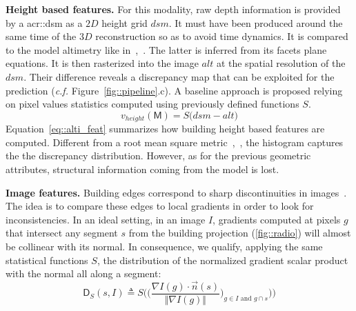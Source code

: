 \documentclass[runningheads]{llncs}
\begin{document}
\noindent
\textbf{Height based features.}
For this modality, raw depth information is provided by a \acrlong{acr::dsm} as a $2D$ height grid $dsm$. It must have been produced around the same time of the $3D$ reconstruction so as to avoid time dynamics. It is compared to the model altimetry like in~\cite{Bredif2007},~\cite{zebedin2008fusion}. The latter is inferred from its facets plane equations. It is then rasterized into the image $alt$ at the spatial resolution of the $dsm$. Their difference reveals a discrepancy map that can be exploited for the prediction (\textit{c.f.} Figure~\ref{fig::pipeline}.c). A baseline approach is proposed relying on pixel values statistics computed using previously defined functions $S$.
\begin{equation}
	\label{eq::alti_feat}
    v_{height}(\mathsf{M}) = S\big( dsm - alt \big)
\end{equation}
Equation~\ref{eq::alti_feat} summarizes how building height based features are computed. Different from a root mean square metric~\cite{lafarge2012creating},~\cite{Poullis2013}, the histogram captures the the discrepancy distribution. However, as for the previous geometric attributes, structural information coming from the model is lost.

\noindent
\textbf{Image features.}
Building edges correspond to sharp discontinuities in images~\cite{ortner2007building}. The idea is to compare these edges to local gradients in order to look for inconsistencies. In an ideal setting, in an image $I$, gradients computed at pixels $g$ that intersect any segment $s$ from the building projection (\ref{fig::radio}) will almost be collinear with its normal. In consequence, we qualify, applying the same statistical functions $S$, the distribution of the normalized gradient scalar product with the normal all along a segment:
\begin{equation}
	\label{eq::corr_seg}
    \mathsf{D}_S(s, I) \triangleq S \bigg( \Big(\frac{\nabla I(g) \cdot \vec{n}(s)}{\Vert \nabla I(g)\Vert})_{g \in I \textrm{ and } g \cap s} \Big)\bigg)
\end{equation}
\end{document}
